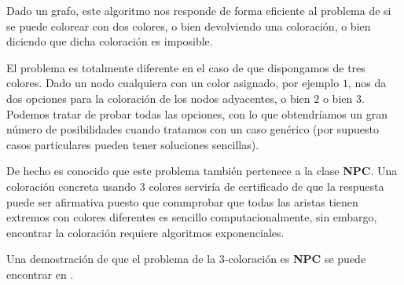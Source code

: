 Dado un grafo, este algoritmo nos responde de forma eficiente al problema de
si se puede colorear con dos colores, o bien devolviendo una coloraci\'on, o bien
diciendo que dicha coloraci\'on es imposible.

El problema es totalmente diferente en el caso de que dispongamos de tres colores.
Dado un nodo cualquiera con un color asignado, por ejemplo $1$, nos da dos opciones
para la coloraci\'on de los nodos adyacentes, o bien $2$ o bien $3$. Podemos tratar
de probar todas las opciones, con lo que obtendr\'iamos un gran n\'umero de posibilidades
cuando tratamos con un caso gen\'erico (por supuesto casos particulares pueden tener
soluciones sencillas).

De hecho es conocido que este problema tambi\'en pertenece a la clase {\bf NPC}. Una coloraci\'on
concreta usando $3$ colores servir\'ia de certificado de que la respuesta puede ser afirmativa puesto
que commprobar que todas las aristas tienen extremos con colores diferentes es sencillo
computacionalmente, sin embargo, encontrar la coloraci\'on requiere algoritmos exponenciales.

Una demostraci\'on de que el problema de la 3-coloraci\'on es {\bf NPC} se puede encontrar
en \cite[Problem 34-3]{algoBB}.

\hfil
